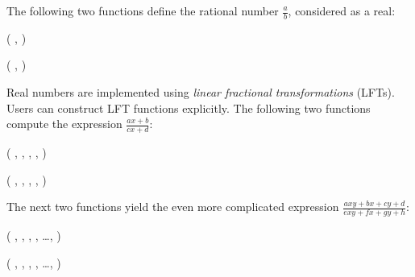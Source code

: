 \documentclass[a4paper,12pt]{article}
\newenvironment{funlist}{\begin{list}%
   {}%
   {\topsep=0pt%
        \leftmargin=0cm%
        \rightmargin=0cm%
        \listparindent=0cm%
        \parskip=10pt%
        \partopsep=0pt%
        \itemsep=0pt%
        \parsep=0pt}}%
   {\end{list}}
\begin{document}
The following two functions define the rational number $\frac{a}{b}$,
considered as a real:
\begin{funlist}
\item {} (%
   ,
   )
\item {} (%
   ,
   )
\end{funlist}

Real numbers are implemented using \emph{linear fractional
transformations} (LFTs). Users can construct
LFT functions explicitly.
The following two functions compute the expression
$\frac{ax+b}{cx+d}$:
\begin{funlist}
\item {} (%
   ,
   ,
   ,
   ,
   )
\item {} (%
   ,
   ,
   ,
   ,
   )
\end{funlist}

\noindent The next two functions yield the even more complicated expression
$\frac{axy + bx + cy + d}{exy + fx + gy + h}$:
\begin{funlist}
\item {} (%
   ,
   ,
   ,
   , 
\ldots,
   )
\item {} (%
   ,
   ,
   ,
   , 
\ldots,
   )
\end{funlist}
\end{document}
